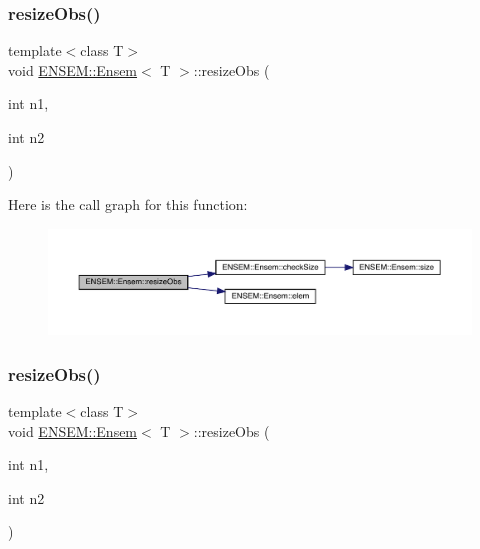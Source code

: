 \subsubsection{\texorpdfstring{resizeObs()}{resizeObs()}\hspace{0.1cm}{\footnotesize\ttfamily [4/12]}}
{\footnotesize\ttfamily template$<$class T$>$ \\
void \mbox{\hyperlink{classENSEM_1_1Ensem}{E\+N\+S\+E\+M\+::\+Ensem}}$<$ T $>$\+::resize\+Obs (\begin{DoxyParamCaption}\item[{int}]{n1,  }\item[{int}]{n2 }\end{DoxyParamCaption})\hspace{0.3cm}{\ttfamily [inline]}}

Here is the call graph for this function\+:
\nopagebreak
\begin{figure}[H]
\begin{center}
\leavevmode
\includegraphics[width=350pt]{d7/d3e/classENSEM_1_1Ensem_af74074307267e421a53a3e9e9e2449fc_cgraph}
\end{center}
\end{figure}
\mbox{\label{classENSEM_1_1Ensem_af74074307267e421a53a3e9e9e2449fc}} 
\subsubsection{\texorpdfstring{resizeObs()}{resizeObs()}\hspace{0.1cm}{\footnotesize\ttfamily [5/12]}}
{\footnotesize\ttfamily template$<$class T$>$ \\
void \mbox{\hyperlink{classENSEM_1_1Ensem}{E\+N\+S\+E\+M\+::\+Ensem}}$<$ T $>$\+::resize\+Obs (\begin{DoxyParamCaption}\item[{int}]{n1,  }\item[{int}]{n2 }\end{DoxyParamCaption})\hspace{0.3cm}{\ttfamily [inline]}}

